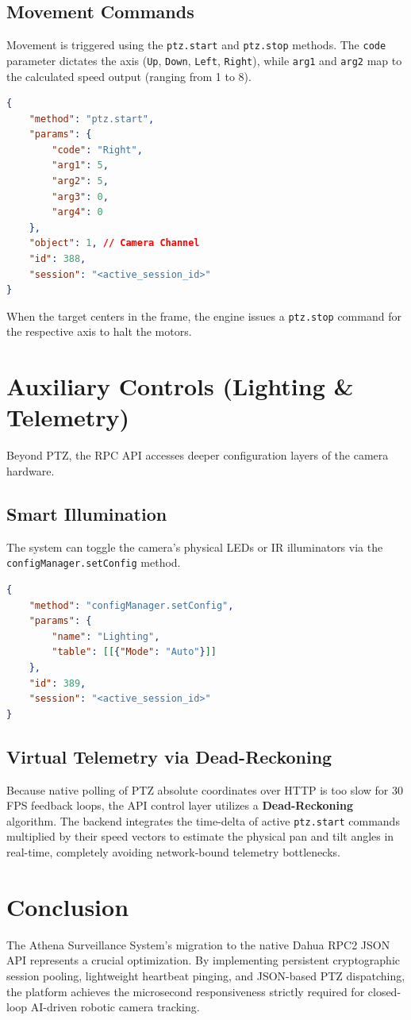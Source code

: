 \documentclass[12pt,a4paper]{article}
\begin{document}
\subsection{Movement Commands}
Movement is triggered using the \texttt{ptz.start} and \texttt{ptz.stop} methods. The \texttt{code} parameter dictates the axis (\texttt{Up}, \texttt{Down}, \texttt{Left}, \texttt{Right}), while \texttt{arg1} and \texttt{arg2} map to the calculated speed output (ranging from 1 to 8).

\begin{lstlisting}[style=jsonstyle, language=json, caption=PTZ Start Command]
{
    "method": "ptz.start",
    "params": {
        "code": "Right",
        "arg1": 5,
        "arg2": 5,
        "arg3": 0,
        "arg4": 0
    },
    "object": 1, // Camera Channel
    "id": 388,
    "session": "<active_session_id>"
}
\end{lstlisting}

When the target centers in the frame, the engine issues a \texttt{ptz.stop} command for the respective axis to halt the motors.

\section{Auxiliary Controls (Lighting \& Telemetry)}
Beyond PTZ, the RPC API accesses deeper configuration layers of the camera hardware.

\subsection{Smart Illumination}
The system can toggle the camera's physical LEDs or IR illuminators via the \texttt{configManager.setConfig} method.
\begin{lstlisting}[style=jsonstyle, language=json, caption=Lighting Configuration]
{
    "method": "configManager.setConfig",
    "params": {
        "name": "Lighting",
        "table": [[{"Mode": "Auto"}]]
    },
    "id": 389,
    "session": "<active_session_id>"
}
\end{lstlisting}

\subsection{Virtual Telemetry via Dead-Reckoning}
Because native polling of PTZ absolute coordinates over HTTP is too slow for 30 FPS feedback loops, the API control layer utilizes a \textbf{Dead-Reckoning} algorithm. The backend integrates the time-delta of active \texttt{ptz.start} commands multiplied by their speed vectors to estimate the physical pan and tilt angles in real-time, completely avoiding network-bound telemetry bottlenecks.

\section{Conclusion}
The Athena Surveillance System's migration to the native Dahua RPC2 JSON API represents a crucial optimization. By implementing persistent cryptographic session pooling, lightweight heartbeat pinging, and JSON-based PTZ dispatching, the platform achieves the microsecond responsiveness strictly required for closed-loop AI-driven robotic camera tracking.
\end{document}
